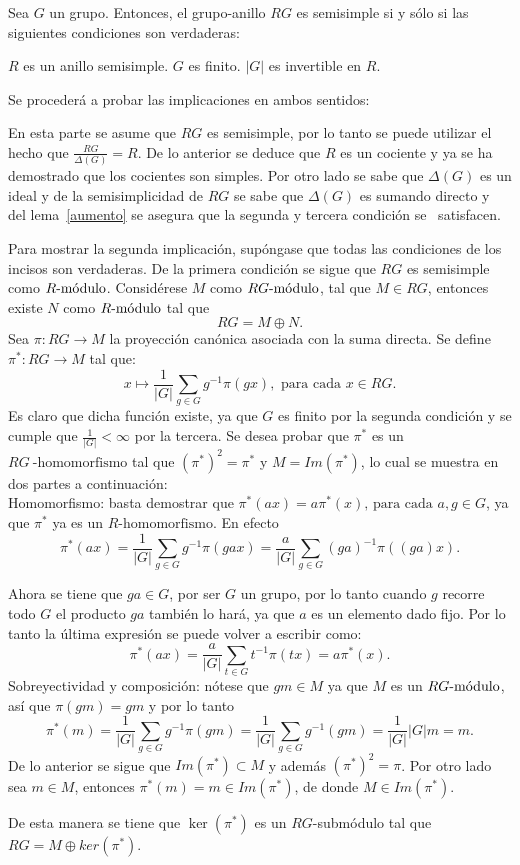 \begin{teorema}[Maschke]
Sea $G$ un grupo. Entonces, el grupo-anillo $RG$ es semisimple si y sólo si las siguientes condiciones son verdaderas:
\begin{bulletList}
\newItem $R$ es un anillo semisimple.
\newItem $G$ es finito.
\newItem $|G|$ es invertible en $R$.
\end{bulletList}
\end{teorema}
\begin{proof*}
Se procederá a probar las implicaciones en ambos sentidos:
\begin{bulletList}
\newItem En esta parte se asume que $RG$ es semisimple, por lo tanto se puede utilizar el hecho que $\frac{RG}{\Delta (G)} = R$. De lo anterior se deduce que $R$ es un cociente y ya se ha demostrado que los cocientes son simples. Por otro lado se sabe que $\Delta (G)$ es un ideal y de la semisimplicidad de $RG$ se sabe que $\Delta (G)$ es sumando directo y del lema~\ref{aumento} se asegura que la segunda y tercera condición se~ satisfacen. 

\newItem  Para mostrar la segunda implicación, supóngase que todas las condiciones de los incisos son verdaderas. 
De la primera condición se sigue que $RG$ es semisimple como $\modulo{R}$. Considérese $M$ como $\modulo{RG}$, tal que $M \in RG$, entonces existe $N$ como $\modulo{R}$ tal que 
\[RG = M \oplus N.\]
Sea $\pi\colon RG \to M$ la proyección canónica asociada con la suma directa. Se define $\pi ^ *  \colon RG \to M$ tal que:
\[x \mapsto \frac{1}{|G|}\sum_{g \in G} g^{-1}\pi (gx), \mbox{ para cada } x \in RG. \] 
Es claro que dicha función existe, ya que $G$ es finito por la segunda condición y se cumple que $\frac{1}{|G|} < \infty$ por la tercera. Se desea probar que $\pi ^ * $ es un $RG~\mbox{-homomorfismo}$  tal que $(\pi ^*)^2 = \pi ^* $ y $M = Im(\pi ^*)$, lo cual se muestra en dos partes a continuación:\\
Homomorfismo: basta demostrar que $\pi ^* (ax) = a \pi^*(x) \mbox{, para cada } a, g \in G$, ya que $\pi^* $ ya es un $R\mbox{-homomorfismo}$. En efecto \[\pi^* (ax) = \frac{1}{|G|} \sum_{g \in G}g^{-1}\pi (gax) = \frac{a}{|G|} \sum_{g \in G}(ga)^{-1}\pi ((ga)x).\]

Ahora se tiene que $ga \in G$, por ser $G$ un grupo, por lo tanto cuando $g$ recorre todo $G$ el producto $ga$ también lo hará, ya que $a$ es un elemento dado fijo. Por lo tanto la última expresión se puede volver a escribir como:
\[\pi^* (ax) = \frac{a}{|G|} \sum_{t \in G}t^{-1}\pi (tx) = a\pi^*(x).\]
\newpage
Sobreyectividad y composición: nótese que $gm \in M$ ya que $M$ es un \nopagebreak[0] $\modulo{RG}$, así que $\pi (gm) = gm$ y por lo tanto 
\[\pi ^* (m) = \frac{1}{|G|} \sum_{g \in G}g^{-1}\pi (gm) = \frac{1}{|G|} \sum_{g \in G}g^{-1}(gm) = \frac{1}{|G|}|G|m  = m.\]
De lo anterior se sigue que $Im(\pi^*) \subset M$ y además $(\pi^*)^2 = \pi $. Por otro lado sea $m \in M$, entonces $\pi ^* (m) = m \in Im(\pi^*)$, de donde $M \in Im(\pi^*)$. 

De esta manera se tiene que $\ker(\pi^*)$ es un $RG$-submódulo tal que $RG = M \oplus ker(\pi^*)$.\qedhere
\end{bulletList}
\end{proof*} 

